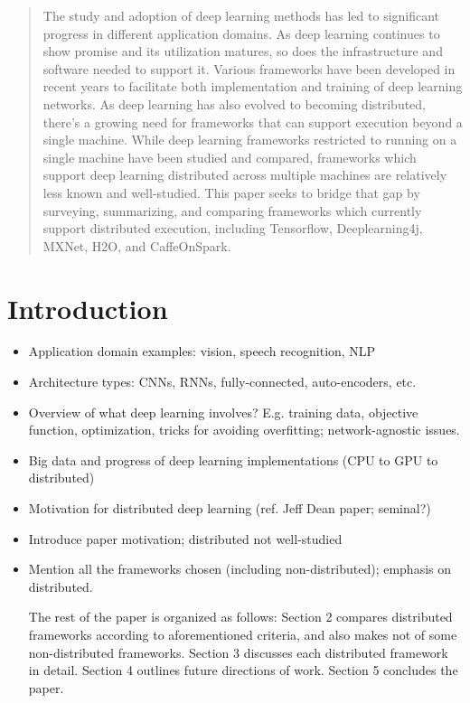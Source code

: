 \documentclass{article}
\begin{document}
\begin{abstract}
The study and adoption of deep learning methods has led to significant progress in different application domains. As deep learning continues to show promise and its utilization matures, so does the infrastructure and software needed to support it. Various frameworks have been developed in recent years to facilitate both implementation and training of deep learning networks. As deep learning has also evolved to becoming distributed, there's a growing need for frameworks that can support execution beyond a single machine. While deep learning frameworks restricted to running on a single machine have been studied and compared, frameworks which support deep learning distributed across multiple machines are relatively less known and well-studied. This paper seeks to bridge that gap by surveying, summarizing, and comparing frameworks which currently support distributed execution, including Tensorflow, Deeplearning4j, MXNet, H2O, and CaffeOnSpark. 
\end{abstract}

\section{Introduction}
\begin{itemize}
\item Application domain examples: vision, speech recognition, NLP
\item Architecture types:  CNNs, RNNs, fully-connected, auto-encoders, etc.
\item Overview of what deep learning involves? E.g. training data, objective function, optimization, tricks for avoiding overfitting; network-agnostic issues. 
\item Big data and progress of deep learning implementations (CPU to GPU to distributed)
\item Motivation for distributed deep learning (ref. Jeff Dean paper; seminal?)
\item Introduce paper motivation; distributed not well-studied
\item Mention all the frameworks chosen (including non-distributed); emphasis on distributed.

The rest of the paper is organized as follows: Section 2 compares distributed frameworks according to aforementioned criteria, and also makes not of some non-distributed  frameworks. Section 3 discusses each distributed framework in detail. Section 4 outlines future directions of work. Section 5 concludes the paper. 

\end{itemize}
\end{document}
